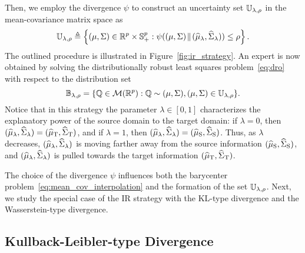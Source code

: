 \documentclass{article}
\begin{document}
Then, we employ the divergence $\psi$ to construct an uncertainty set $\mathbb U_{\lambda, \rho}$ in the mean-covariance matrix space as 
\[
    \mathbb U_{\lambda, \rho} \triangleq \left\{ (\mu, \Sigma)\in \mathbb{R}^p\times \mathbb{S}_{+}^p: \psi( (\mu, \Sigma)\! \parallel\! (\widehat {\mu}_\lambda, \widehat{\Sigma}_\lambda)) \le \rho \right\}.
\]
The outlined procedure is illustrated in Figure~\ref{fig:ir_strategy}. An expert is now obtained by solving the distributionally robust least squares problem~\eqref{eq:dro} with respect to the distribution set
\[\mathbb B_{\lambda,\rho} = \{\mathbb Q \in \mathcal M(\mathbb{R}^p) : \mathbb Q \sim (\mu, \Sigma), (\mu, \Sigma) \in \mathbb U_{\lambda, \rho}\}.\]
Notice that in this strategy the parameter $\lambda \in [0, 1]$ characterizes the explanatory power of the source domain to the target domain: if $\lambda = 0$, then $(\widehat {\mu}_\lambda, \widehat{\Sigma}_\lambda) = (\widehat {\mu}_{\rm T}, \widehat{\Sigma}_{\rm T})$, and if $\lambda = 1$, then $(\widehat {\mu}_\lambda, \widehat{\Sigma}_\lambda) = (\widehat {\mu}_{\rm S}, \widehat{\Sigma}_{\rm S})$. Thus, as $\lambda$ decreases, $(\widehat {\mu}_\lambda, \widehat{\Sigma}_\lambda)$ is moving farther away from the source information $(\widehat {\mu}_{\rm S}, \widehat{\Sigma}_{\rm S})$, and $(\widehat {\mu}_\lambda, \widehat{\Sigma}_\lambda)$ is pulled towards the target information $(\widehat {\mu}_{\rm T}, \widehat{\Sigma}_{\rm T})$. 

The choice of the divergence $\psi$ influences both the barycenter problem~\eqref{eq:mean_cov_interpolation} and the formation of the set $\mathbb U_{\lambda, \rho}$. Next, we study the special case of the IR strategy with the KL-type divergence and the Wasserstein-type divergence.

    
    


\subsection{Kullback-Leibler-type Divergence}
\end{document}
